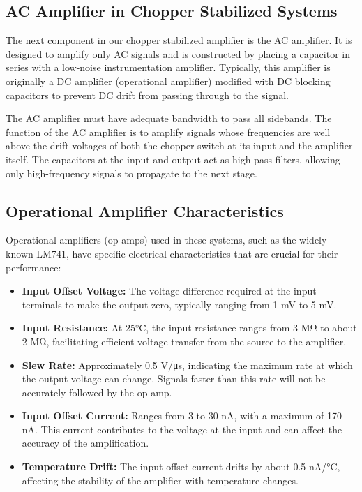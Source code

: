 \subsection{AC Amplifier in Chopper Stabilized Systems}
The next component in our chopper stabilized amplifier is the AC amplifier. It is designed to amplify only AC signals and is constructed by placing a capacitor in series with a low-noise instrumentation amplifier. Typically, this amplifier is originally a DC amplifier (operational amplifier) modified with DC blocking capacitors to prevent DC drift from passing through to the signal.

The AC amplifier must have adequate bandwidth to pass all sidebands. The function of the AC amplifier is to amplify signals whose frequencies are well above the drift voltages of both the chopper switch at its input and the amplifier itself. The capacitors at the input and output act as high-pass filters, allowing only high-frequency signals to propagate to the next stage.

\subsection{Operational Amplifier Characteristics}
Operational amplifiers (op-amps) used in these systems, such as the widely-known LM741, have specific electrical characteristics that are crucial for their performance:
\begin{itemize}
    \item \textbf{Input Offset Voltage:} The voltage difference required at the input terminals to make the output zero, typically ranging from 1 mV to 5 mV.
    \item \textbf{Input Resistance:} At 25°C, the input resistance ranges from 3 MΩ to about 2 MΩ, facilitating efficient voltage transfer from the source to the amplifier.
    \item \textbf{Slew Rate:} Approximately 0.5 V/μs, indicating the maximum rate at which the output voltage can change. Signals faster than this rate will not be accurately followed by the op-amp.
    \item \textbf{Input Offset Current:} Ranges from 3 to 30 nA, with a maximum of 170 nA. This current contributes to the voltage at the input and can affect the accuracy of the amplification.
    \item \textbf{Temperature Drift:} The input offset current drifts by about 0.5 nA/°C, affecting the stability of the amplifier with temperature changes.
\end{itemize}

